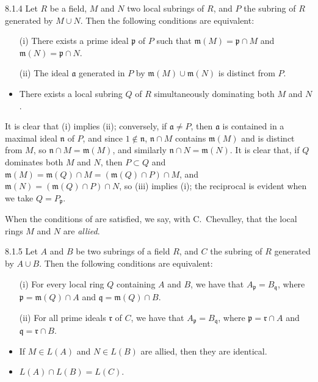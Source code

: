 \documentclass[../main.tex]{subfiles}
\begin{document}
\begin{env}[Lemma]{8.1.4}
Let $R$ be a field, $M$ and $N$ two local
subrings of $R$, and $P$ the subring of $R$ generated by $M\cup N$. Then the
following conditions are equivalent:
\begin{itemize}
  \item[(i)] There exists a prime ideal $\mathfrak{p}$ of $P$ such that
$\mathfrak{m}(M)=\mathfrak{p}\cap M$ and $\mathfrak{m}(N)=\mathfrak{p}\cap N$.
  \item[(ii)] The ideal $\mathfrak{a}$ generated in $P$ by
$\mathfrak{m}(M)\cup\mathfrak{m}(N)$ is distinct from $P$. \item There exists a
local subring $Q$ of $R$ simultaneously dominating both $M$ and $N$.
\end{itemize}
\end{env}

It is clear that (i) implies (ii); conversely, if $\mathfrak{a}\neq P$, then
$\mathfrak{a}$ is contained in a maximal ideal $\mathfrak{n}$ of $P$, and since
$1\not\in\mathfrak{n}$, $\mathfrak{n}\cap M$ contains $\mathfrak{m}(M)$ and is
distinct from $M$, so $\mathfrak{n}\cap M=\mathfrak{m}(M)$, and similarly
$\mathfrak{n}\cap N=\mathfrak{m}(N)$. It is clear that, if $Q$ dominates both
$M$ and $N$, then $P\subset Q$ and $\mathfrak{m}(M)=\mathfrak{m}(Q)\cap
M=(\mathfrak{m}(Q)\cap P)\cap M$, and $\mathfrak{m}(N)=(\mathfrak{m}(Q)\cap
P)\cap N$, so (iii) implies (i); the reciprocal is evident when we take
$Q=P_\mathfrak{p}$.

When the conditions of  are satisfied, we say, with C.~Chevalley,
that the local rings $M$ and $N$ are \emph{allied}.

\begin{env}[Proposition]{8.1.5}
Let $A$ and $B$ be two subrings of a field $R$,
and $C$ the subring of $R$ generated by $A\cup B$. Then the following
conditions are equivalent:
\begin{itemize}
  \item[(i)] For every local ring $Q$ containing $A$ and $B$, we have that
  $A_\mathfrak{p}=B_\mathfrak{q}$, where $\mathfrak{p}=\mathfrak{m}(Q)\cap A$ and
$\mathfrak{q}=\mathfrak{m}(Q)\cap B$.
  \item[(ii)] For all prime ideals $\mathfrak{r}$
of $C$, we have that $A_\mathfrak{p}=B_\mathfrak{q}$, where
$\mathfrak{p}=\mathfrak{r}\cap A$ and $\mathfrak{q}=\mathfrak{r}\cap B$. \item
If $M\in L(A)$ and $N\in L(B)$ are allied, then they are identical. \item
$L(A)\cap L(B)=L(C)$.
\end{itemize}
\end{env}
\end{document}
